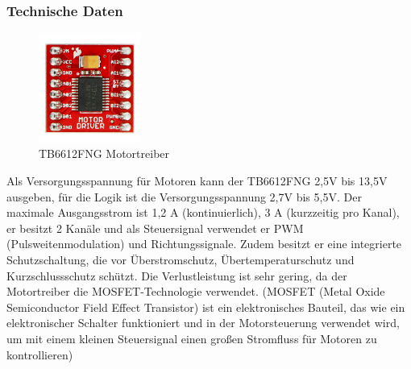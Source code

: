 \subsubsection{Technische Daten}
\begin{figure}[H]
    \centering
    \includegraphics[width=0.3\textwidth]{img/Hardware/Motortreiber.png}
    \caption{TB6612FNG Motortreiber}
    \label{fig:motortreiber}
\end{figure}
Als Versorgungsspannung für Motoren kann der TB6612FNG 2,5V bis 13,5V ausgeben,
für die Logik ist die Versorgungsspannung 2,7V bis 5,5V.
%
Der maximale Ausgangsstrom ist 1,2 A (kontinuierlich), 3 A (kurzzeitig pro Kanal),
er besitzt 2 Kanäle und als Steuersignal verwendet er PWM (Pulsweitenmodulation) und Richtungssignale.
%
Zudem besitzt er eine integrierte Schutzschaltung,
die vor Überstromschutz, Übertemperaturschutz und Kurzschlussschutz schützt. 
%
Die Verlustleistung ist sehr gering,
da der Motortreiber die MOSFET-Technologie verwendet.
%
(MOSFET (Metal Oxide Semiconductor Field Effect Transistor) ist ein elektronisches Bauteil, 
das wie ein elektronischer Schalter funktioniert und in der Motorsteuerung verwendet wird,
um mit einem kleinen Steuersignal einen großen Stromfluss für Motoren zu kontrollieren)
